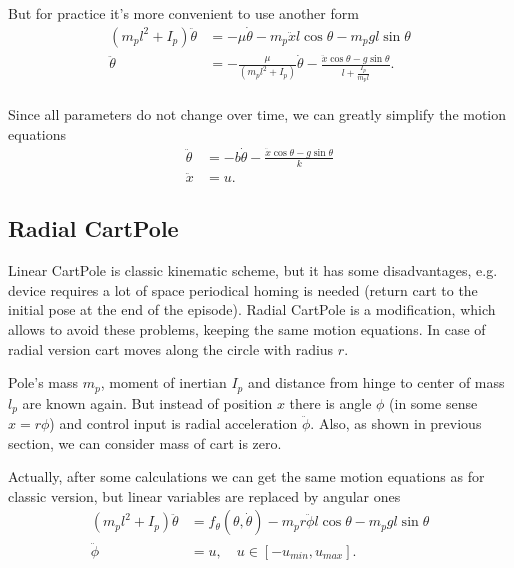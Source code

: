 \documentclass[12pt]{article}
\begin{document}
But for practice it's more convenient to use another form
\begin{align*}
    \left(m_p l^2 + I_p\right) \ddot{\theta} &= -\mu\dot{\theta} - m_p \ddot{x} l \cos \theta - m_p g l \sin \theta \\
    \ddot{\theta} &= -\frac{\mu}{\left(m_p l^2 + I_p\right)}\dot{\theta} - \frac{\ddot{x} \cos \theta - g \sin \theta}{l + \frac{I_p}{m_p l}}. \\
\end{align*}

Since all parameters do not change over time, we can greatly simplify the motion equations
\begin{align}
    \ddot{\theta} &= -b\dot{\theta} - \frac{\ddot{x} \cos \theta - g \sin \theta}{k} \nonumber \\
    \ddot{x} &= u.
\end{align}

\subsection{Radial CartPole}

Linear CartPole is classic kinematic scheme, but it has some disadvantages,
e.g. device requires a lot of space periodical homing is needed (return cart to the initial pose at the end of the episode).
Radial CartPole is a modification, which allows to avoid these problems, keeping the same motion equations.
In case of radial version cart moves along the circle with radius $r$.

\begin{center}
    \begin{adjustbox}{width=0.7\textwidth}
        
    \end{adjustbox}
\end{center}

Pole's mass $m_p$, moment of inertian $I_p$ and distance from hinge to center of mass $l_p$ are known again.
But instead of position $x$ there is angle $\phi$ (in some sense $x = r\phi$) and control input is radial acceleration $\ddot{\phi}$.
Also, as shown in previous section, we can consider mass of cart is zero.

Actually, after some calculations we can get the same motion equations as for classic version,
but linear variables are replaced by angular ones
\begin{align}
    \left(m_p l^2 + I_p\right) \ddot{\theta} &= f_{\theta}(\theta, \dot{\theta}) - m_p r \ddot{\phi} l \cos \theta - m_p g l \sin \theta \nonumber \\
    \ddot{\phi}  &= u, \quad u \in [-u_{min}, u_{max}].
\end{align}
\end{document}
